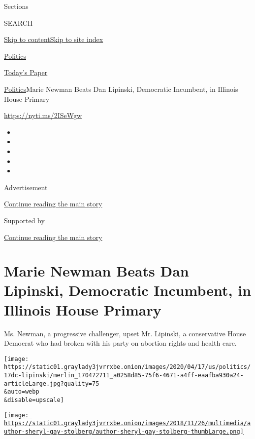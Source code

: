 Sections

SEARCH

\protect\hyperlink{site-content}{Skip to
content}\protect\hyperlink{site-index}{Skip to site index}

\href{https://www.nytimes3xbfgragh.onion/section/politics}{Politics}

\href{https://myaccount.nytimes3xbfgragh.onion/auth/login?response_type=cookie\&client_id=vi}{}

\href{https://www.nytimes3xbfgragh.onion/section/todayspaper}{Today's
Paper}

\href{/section/politics}{Politics}\textbar{}Marie Newman Beats Dan
Lipinski, Democratic Incumbent, in Illinois House Primary

\url{https://nyti.ms/2ISeWgw}

\begin{itemize}
\item
\item
\item
\item
\item
\end{itemize}

Advertisement

\protect\hyperlink{after-top}{Continue reading the main story}

Supported by

\protect\hyperlink{after-sponsor}{Continue reading the main story}

\hypertarget{marie-newman-beats-dan-lipinski-democratic-incumbent-in-illinois-house-primary}{%
\section{Marie Newman Beats Dan Lipinski, Democratic Incumbent, in
Illinois House
Primary}\label{marie-newman-beats-dan-lipinski-democratic-incumbent-in-illinois-house-primary}}

Ms. Newman, a progressive challenger, upset Mr. Lipinski, a conservative
House Democrat who had broken with his party on abortion rights and
health care.

\texttt{[image: https://static01.graylady3jvrrxbe.onion/images/2020/04/17/us/politics/17dc-lipinski/merlin\_170472711\_a0258d85-75f6-4671-a4ff-eaafba930a24-articleLarge.jpg?quality=75\\\&auto=webp\\\&disable=upscale]}

\href{https://www.nytimes3xbfgragh.onion/by/sheryl-gay-stolberg}{\texttt{[image: https://static01.graylady3jvrrxbe.onion/images/2018/11/26/multimedia/author-sheryl-gay-stolberg/author-sheryl-gay-stolberg-thumbLarge.png]}}

